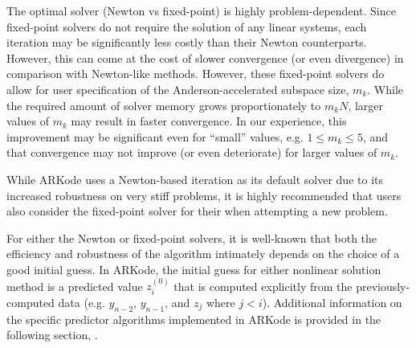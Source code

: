 \documentclass[letterpaper,10pt,english]{sphinxmanual}
\begin{document}
The optimal solver (Newton vs fixed-point) is highly
problem-dependent.  Since fixed-point solvers do not require
the solution of any linear systems, each iteration may be
significantly less costly than their Newton counterparts.  However,
this can come at the cost of slower convergence (or even divergence)
in comparison with Newton-like methods.  However, these fixed-point
solvers do allow for user specification of the Anderson-accelerated
subspace size, \(m_k\).  While the required amount of solver
memory grows proportionately to \(m_k N\), larger values of
\(m_k\) may result in faster convergence.  In our experience, this
improvement may be significant even for ``small'' values,
e.g. \(1\le m_k\le 5\), and that convergence may not improve (or
even deteriorate) for larger values of \(m_k\).

While ARKode uses a Newton-based iteration as its default solver due
to its increased robustness on very stiff problems, it is highly
recommended that users also consider the fixed-point solver for their
when attempting a new problem.

For either the Newton or fixed-point solvers, it is well-known that
both the efficiency and robustness of the algorithm intimately depends
on the choice of a good initial guess.  In ARKode, the initial guess
for either nonlinear solution method is a predicted value
\(z_i^{(0)}\) that is computed explicitly from the
previously-computed data (e.g. \(y_{n-2}\), \(y_{n-1}\), and
\(z_j\) where \(j<i\)).  Additional information on the
specific predictor algorithms implemented in ARKode is provided in the
following section, {\hyperref[Mathematics:mathematics-predictors]{\emph{}}}.
\end{document}
